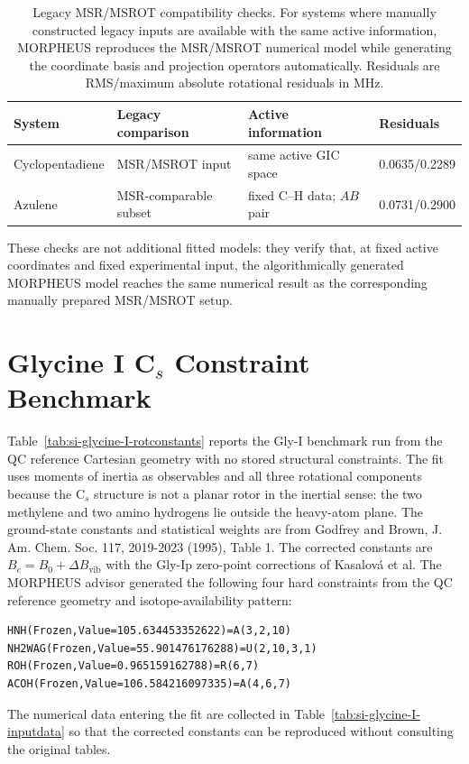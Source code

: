 \documentclass[12pt]{article}
\begin{document}
\clearpage

\begin{table}
\caption{Legacy MSR/MSROT compatibility checks. For systems where manually
constructed legacy inputs are available with the same active information,
MORPHEUS reproduces the MSR/MSROT numerical model while generating the
coordinate basis and projection operators automatically. Residuals are
RMS/maximum absolute rotational residuals in MHz.}
\label{tab:si-msrot-checks}
\footnotesize
\begin{tabular}{llll}
\toprule
System & Legacy comparison & Active information & Residuals \\
\midrule
Cyclopentadiene & MSR/MSROT input & same active GIC space & 0.0635/0.2289 \\
Azulene & MSR-comparable subset & fixed C--H data; $AB$ pair & 0.0731/0.2900 \\
\bottomrule
\end{tabular}
\end{table}

These checks are not additional fitted models: they verify that, at fixed
active coordinates and fixed experimental input, the algorithmically generated
MORPHEUS model reaches the same numerical result as the corresponding
manually prepared MSR/MSROT setup.

\section{\texorpdfstring{Glycine I C$_s$ Constraint Benchmark}{Glycine I Cs Constraint Benchmark}}

Table~\ref{tab:si-glycine-I-rotconstants} reports the Gly-I benchmark run from
the QC reference Cartesian geometry with no stored structural constraints. The fit uses
moments of inertia as observables and all three rotational components because
the C$_s$ structure is not a planar rotor in the inertial sense: the two
methylene and two amino hydrogens lie outside the heavy-atom plane. The
ground-state constants and statistical weights are from Godfrey and Brown,
J. Am. Chem. Soc. 117, 2019-2023 (1995), Table 1. The corrected constants are
$B_e=B_0+\Delta B_\mathrm{vib}$ with the Gly-Ip zero-point corrections of
Kasalov{\'a} et al. The MORPHEUS advisor generated the following four hard
constraints from the QC reference geometry and isotope-availability pattern:
\begin{verbatim}
HNH(Frozen,Value=105.634453352622)=A(3,2,10)
NH2WAG(Frozen,Value=55.901476176288)=U(2,10,3,1)
ROH(Frozen,Value=0.965159162788)=R(6,7)
ACOH(Frozen,Value=106.584216097335)=A(4,6,7)
\end{verbatim}
The numerical data entering the fit are collected in
Table~\ref{tab:si-glycine-I-inputdata} so that the corrected constants can be
reproduced without consulting the original tables.
\end{document}
